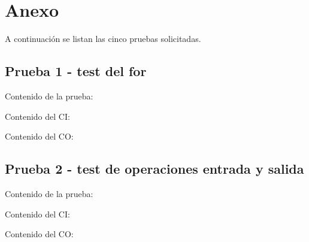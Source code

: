 \documentclass[11pt, , a4paper, titlepage]{article}
\newenvironment{changemargin}[2]{%
\begin{list}{}{%
\setlength{\topsep}{0pt}%
\setlength{\leftmargin}{#1}%
\setlength{\rightmargin}{#2}%
\setlength{\listparindent}{\parindent}%
\setlength{\itemindent}{\parindent}%
\setlength{\parsep}{\parskip}%
}%
\item[]}{\end{list}}
\begin{document}
\clearpage
\section{Anexo}
A continuación se listan las cinco pruebas solicitadas.


\subsection{Prueba 1 - test del for}
\vspace{2mm}
Contenido de la prueba:
\vspace{2mm}
\begin{changemargin}{+3cm}{+2cm}
    
\end{changemargin} 
\vspace{2mm}
Contenido del CI:
\vspace{2mm}
\begin{changemargin}{+1cm}{+0cm}
    
\end{changemargin} 
\vspace{2mm}
Contenido del CO:
\vspace{2mm}
\begin{changemargin}{+1cm}{-2cm}
    
\end{changemargin} 

\clearpage

\subsection{Prueba 2 - test de operaciones entrada y salida}
\vspace{2mm}
Contenido de la prueba:
\vspace{2mm}
\begin{changemargin}{+3cm}{+2cm}
    
\end{changemargin} 
\vspace{2mm}
Contenido del CI:
\vspace{2mm}
\begin{changemargin}{+1cm}{+0cm}
    
\end{changemargin} 
\vspace{2mm}
Contenido del CO:
\vspace{2mm}
\begin{changemargin}{+1cm}{-2cm}
    
\end{changemargin} 
\end{document}
